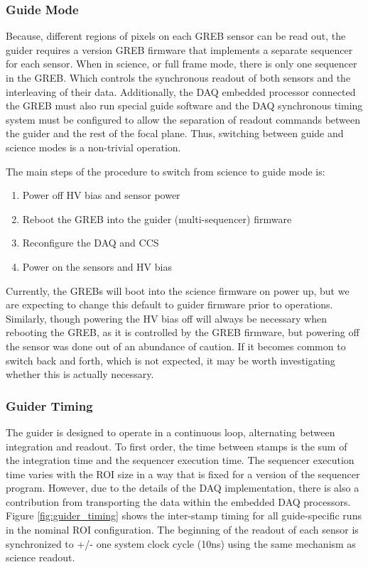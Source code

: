 \subsubsection{Guide Mode}
Because, different regions of pixels on each GREB sensor can be read out, the guider requires a version GREB firmware that implements a separate sequencer for each sensor. When in science, or full frame mode, there is only one sequencer in the GREB. Which controls the synchronous readout of both sensors and the interleaving of their data. Additionally, the DAQ embedded processor connected the GREB must also run special guide software and the DAQ synchronous timing system must be configured to allow the separation of readout commands between the guider and the rest of the focal plane. Thus, switching between guide and science modes is a non-trivial operation. 

The main steps of the procedure to switch from science to guide mode is:
\begin{enumerate}
    \item Power off HV bias and sensor power
    \item Reboot the GREB into the guider (multi-sequencer) firmware
    \item Reconfigure the DAQ and CCS
    \item Power on the sensors and HV bias
\end{enumerate}

Currently, the GREBs will boot into the science firmware on power up, but we are expecting to change this default to guider firmware prior to operations. Similarly, though powering the HV bias off will always be necessary when rebooting the GREB, as it is controlled by the GREB firmware, but powering off the sensor was done out of an abundance of caution. If it becomes common to switch back and forth, which is not expected, it may be worth investigating whether this is actually necessary.

\subsubsection{Guider Timing}
The guider is designed to operate in a continuous loop, alternating between integration and readout. To first order, the time between stamps is the sum of the integration time and the sequencer execution time. The sequencer execution time varies with the ROI size in a way that is fixed for a version of the sequencer program. However, due to the details of the DAQ implementation, there is also a contribution from transporting the data within the embedded DAQ processors. Figure \ref{fig:guider_timing} shows the inter-stamp timing for all guide-specific runs in the nominal ROI configuration. The beginning of the readout of each sensor is synchronized to +/- one system clock cycle (10ns) using the same mechanism as science readout. 

